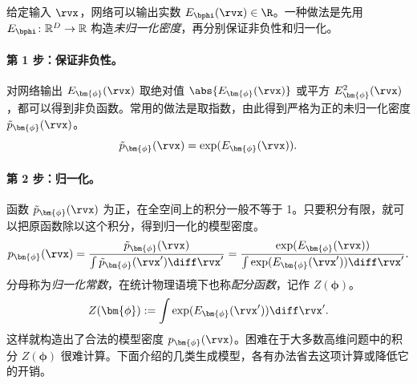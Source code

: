 给定输入 $\rvx$，网络可以输出实数 $E_{\bphi}(\rvx) \in \R$。一种做法是先用 $E_{\bphi}\colon\mathbb{R}^D\to\mathbb{R}$ 构造\emph{未归一化密度}，再分别保证非负性和归一化。


\paragraph{第 1 步：保证非负性。}
对网络输出 $E_{\bm{\phi}}(\rvx)$ 取绝对值 $\abs{E_{\bm{\phi}}(\rvx)}$ 或平方 $E^2_{\bm{\phi}}(\rvx)$，都可以得到非负函数。常用的做法是取指数，由此得到严格为正的未归一化密度 $\tilde{p}_{\bm{\phi}}(\rvx)$。
\[
\tilde{p}_{\bm{\phi}}(\rvx) = \exp(E_{\bm{\phi}}(\rvx)).
\]

\paragraph{第 2 步：归一化。}
函数 $\tilde{p}_{\bm{\phi}}(\rvx)$ 为正，在全空间上的积分一般不等于 1。只要积分有限，就可以把原函数除以这个积分，得到归一化的模型密度。
\[
p_{\bm{\phi}}(\rvx) = \frac{\tilde{p}_{\bm{\phi}}(\rvx)}{\int \tilde{p}_{\bm{\phi}}(\rvx') \diff \rvx'} = \frac{\exp(E_{\bm{\phi}}(\rvx))}{\int \exp(E_{\bm{\phi}}(\rvx')) \diff \rvx'}.
\]
分母称为\emph{归一化常数}，在统计物理语境下也称\emph{配分函数}，记作 $Z(\bm{\phi})$。
\[
Z(\bm{\phi}) := \int \exp(E_{\bm{\phi}}(\rvx')) \diff \rvx'.
\]
这样就构造出了合法的模型密度 $p_{\bm{\phi}}(\rvx)$。困难在于大多数高维问题中的积分 $Z(\bm{\phi})$ 很难计算。下面介绍的几类生成模型，各有办法省去这项计算或降低它的开销。



